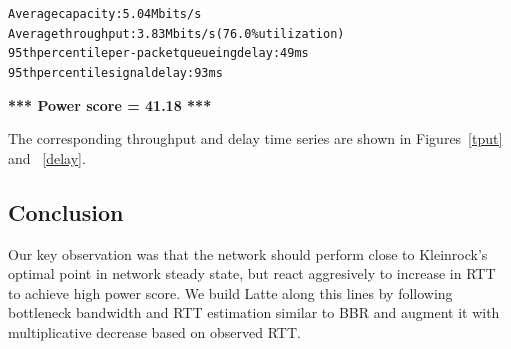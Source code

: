 \documentclass{article}
\begin{document}
\begin{mdframed}
\begin{alltt}
Average capacity: 5.04 Mbits/s
Average throughput: 3.83 Mbits/s (76.0\% utilization)
95th percentile per-packet queueing delay: 49 ms
95th percentile signal delay: 93 ms
\end{alltt}

\textbf{*** Power score = 41.18 ***}
\end{mdframed}

The corresponding throughput and delay time series are shown in
Figures~\ref{tput} and ~\ref{delay}.

\subsection{Conclusion} Our key observation was that the network
should perform close to Kleinrock's optimal point in network steady
state, but react aggresively to increase in RTT to achieve high power
score. We build Latte along this lines by following bottleneck
bandwidth and RTT estimation similar to BBR and augment it with
multiplicative decrease based on observed RTT.



\end{document}
